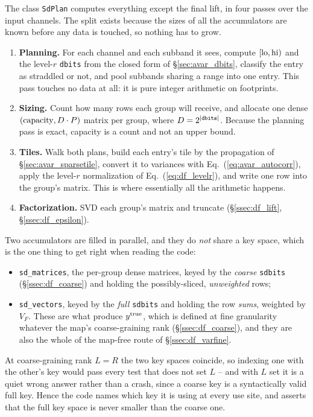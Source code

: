\documentclass{article}
\numberwithin{equation}{section}   %
\begin{document}
The class \verb|SdPlan| computes everything except the final lift, in four passes over the input
channels. The split exists because the sizes of all the accumulators are known before any data is
touched, so nothing has to grow.

\begin{enumerate}
\item {\bf Planning.} For each channel and each subband it sees, compute
$[{\rm lo}, {\rm hi})$ and the level-$r$ {\tt dbits} from the closed form of
\S\ref{sec:avar_dbits}, classify the entry as straddled or not, and pool subbands sharing a range
into one entry. This pass touches no data at all: it is pure integer arithmetic on footprints.
\item {\bf Sizing.} Count how many rows each group will receive, and allocate one dense
$({\rm capacity}, D\cdot P)$ matrix per group, where $D = 2^{|{\tt dbits}|}$. Because the
planning pass is exact, capacity is a count and not an upper bound.
\item {\bf Tiles.} Walk both plans, build each entry's tile by the propagation of
\S\ref{sec:avar_sparsetile}, convert it to variances with Eq.\ (\ref{eq:avar_autocorr}), apply
the level-$r$ normalization of Eq.\ (\ref{eq:df_levelr}), and write one row into the group's
matrix. This is where essentially all the arithmetic happens.
\item {\bf Factorization.} SVD each group's matrix and truncate (\S\ref{ssec:df_lift},
\S\ref{ssec:df_epsilon}).
\end{enumerate}

Two accumulators are filled in parallel, and they do {\em not} share a key space, which is the
one thing to get right when reading the code:
\begin{itemize}
\item {\tt sd\_matrices}, the per-group dense matrices, keyed by the {\em coarse} {\tt sdbits}
(\S\ref{ssec:df_coarse}) and holding the possibly-sliced, {\em unweighted} rows;
\item {\tt sd\_vectors}, keyed by the {\em full} {\tt sdbits} and holding the row {\em sums},
weighted by $V_F$. These are what produce $y^{\rm true}$, which is defined at fine granularity
whatever the map's coarse-graining rank (\S\ref{ssec:df_coarse}), and they are also the whole of
the map-free route of \S\ref{ssec:df_varfine}.
\end{itemize}
At coarse-graining rank $L = R$ the two key spaces coincide, so indexing one with the other's key
would pass every test that does not set $L$ -- and with $L$ set it is a quiet wrong answer rather
than a crash, since a coarse key is a syntactically valid full key. Hence the code names which
key it is using at every use site, and asserts that the full key space is never smaller than the
coarse one.
\end{document}
